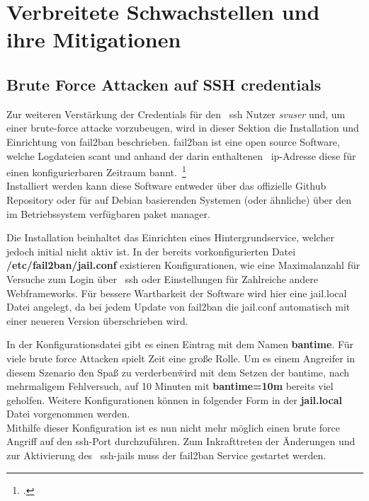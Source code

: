 
\section{Verbreitete Schwachstellen und ihre Mitigationen}\label{sec:bekannte-schwachstellen-und-ihre-mitegationen}

\subsection{Brute Force Attacken auf SSH credentials}\label{subsec:fail2ban}
Zur weiteren Verstärkung der Credentials für den ~\gls{ssh} Nutzer \textit{svuser} und, um einer brute-force attacke vorzubeugen,
wird in dieser Sektion die Installation und Einrichtung von fail2ban beschrieben.
fail2ban ist eine open source Software, welche Logdateien scant und anhand der darin enthaltenen ~\gls{ip}-Adresse diese für einen konfigurierbaren
Zeitraum bannt.~\footcite{fail2ban} \\
Installiert werden kann diese Software entweder über das offizielle Github Repository oder für auf Debian basierenden Systemen (oder ähnliche) über den im
Betriebssystem verfügbaren paket manager.


Die Installation beinhaltet das Einrichten eines Hintergrundservice, welcher jedoch initial nicht aktiv ist.
In der bereits vorkonfigurierten Datei \textbf{/etc/fail2ban/jail.conf} existieren Konfigurationen, wie
eine Maximalanzahl für Versuche zum Login über ~\gls{ssh} oder Einstellungen für Zahlreiche andere Webframeworks.
Für bessere Wartbarkeit der Software wird hier eine jail.local Datei angelegt, da bei jedem Update von fail2ban die jail.conf automatisch mit einer
neueren Version überschrieben wird.

\blankline
In der Konfigurationsdatei gibt es einen Eintrag mit dem Namen \textbf{bantime}.
Für viele brute force Attacken spielt Zeit eine große Rolle.
Um es einem Angreifer in diesem Szenario \"den Spaß zu verderben\" wird mit dem Setzen der bantime, nach mehrmaligem Fehlversuch, auf 10 Minuten mit \textbf{bantime=10m}
bereits viel geholfen.
Weitere Konfigurationen können in folgender Form in der \textbf{jail.local} Datei vorgenommen werden.\\

Mithilfe dieser Konfiguration ist es nun nicht mehr möglich einen brute force Angriff auf den \gls{ssh}-Port durchzuführen.
Zum Inkrafttreten der Änderungen und zur Aktivierung des ~\gls{ssh}-jails muss der fail2ban Service gestartet werden.
